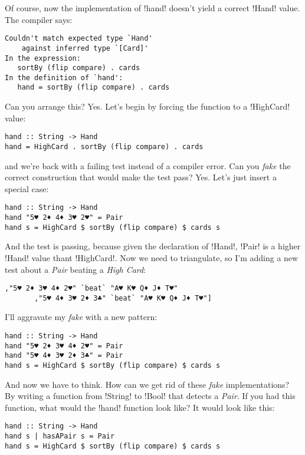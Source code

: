 \error Of course, now the implementation of \il!hand! doesn't yield a correct \il!Hand! value.
\lhN The compiler says:
\begin{small}
\begin{verbatim}
Couldn't match expected type `Hand' 
    against inferred type `[Card]'
In the expression: 
   sortBy (flip compare) . cards
In the definition of `hand': 
   hand = sortBy (flip compare) . cards
\end{verbatim}
\end{small}
Can you arrange this?
\lhA Yes. Let's begin by forcing the function to a \il!HighCard! value:
\begin{lstlisting}[frame=single]
hand :: String -> Hand
hand = HighCard . sortBy (flip compare) . cards
\end{lstlisting}
\failure and we're back with a failing test instead of a compiler error.
\lhN Can you \emph{fake} the correct construction that would make the test pass?
\lhA Yes. Let's just insert a special case:
\begin{lstlisting}[frame=single]
hand :: String -> Hand
hand "5♥ 2♦ 4♦ 3♥ 2♥" = Pair 
hand s = HighCard $ sortBy (flip compare) $ cards s
\end{lstlisting}
\success And the test is passing, because given the declaration of \il!Hand!, \il!Pair! is a higher \il!Hand! value thant \il!HighCard!.
\lhN Now we need to triangulate, so I'm adding a new test about a \emph{Pair} beating a \emph{High Card}:
\begin{lstlisting}[frame=single]
       ,"5♥ 2♦ 3♥ 4♦ 2♥" `beat` "A♥ K♥ Q♦ J♦ T♥"
       ,"5♥ 4♦ 3♥ 2♦ 3♣" `beat` "A♥ K♥ Q♦ J♦ T♥"]
\end{lstlisting}
\hspace*{\fill}
\lhA \failure I'll aggravate my \emph{fake} with a new pattern:
\begin{lstlisting}[frame=single]
hand :: String -> Hand
hand "5♥ 2♦ 3♥ 4♦ 2♥" = Pair 
hand "5♥ 4♦ 3♥ 2♦ 3♣" = Pair
hand s = HighCard $ sortBy (flip compare) $ cards s
\end{lstlisting}
\success And now we have to think.
\lhN How can we get rid of these \emph{fake} implementations?
\lhA By writing a function from \il!String! to \il!Bool! that detects a \emph{Pair}.
\lhN If you had this function, what would the \il!hand! function look like?
\lhA It would look like this:
\begin{lstlisting}[frame=single]
hand :: String -> Hand
hand s | hasAPair s = Pair
hand s = HighCard $ sortBy (flip compare) $ cards s
\end{lstlisting}
